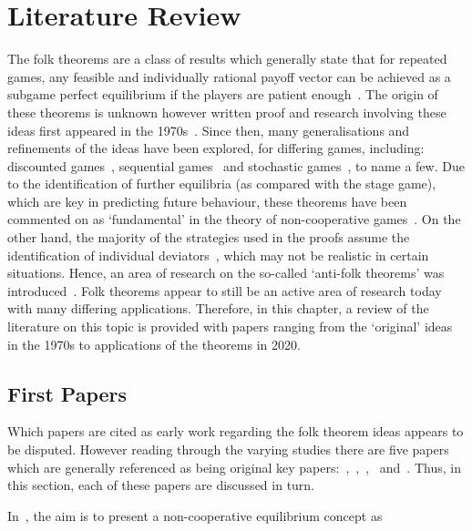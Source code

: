 \chapter{Literature Review}

The folk theorems are a class of results which generally state that for repeated
games, any feasible and individually rational payoff vector can be achieved as a
subgame perfect equilibrium if the players are patient enough~\cite{Li2019}. The
origin of these theorems is unknown however written proof and
research involving these ideas first appeared in the 1970s~\cite{Friedman1971,
Aumann1994, Rubinstein1979}. Since then, many generalisations and refinements of
the ideas have been explored, for differing games, including:
discounted games~\cite{Li2019, Fudenberg1986, Friedman1971}, sequential
games~\cite{} and stochastic games~\cite{}, to
name a few. Due to the identification of further equilibria (as compared with
the stage game), which are key in predicting future behaviour, these theorems
have been commented on as `fundamental' in the theory of non-cooperative
games~\cite{}. On the other hand, the majority of the strategies used in the
proofs assume the identification of individual deviators~\cite{Masso1989}, which may not
be realistic in certain situations. Hence, an area of research on the so-called
`anti-folk theorems' was introduced~\cite{Carmona2006, Masso1989, Peski2012}. Folk theorems appear to still be an
active area of research today~\cite{Ikeda2020, Parras2020, Wang2020} with many differing applications.
Therefore, in this chapter, a review of the literature on this topic is provided
with papers ranging from the `original' ideas in the 1970s to applications of
the theorems in 2020. 


\section{First Papers}
Which papers are cited as early work regarding the folk theorem ideas appears to
be disputed. However reading through the varying studies there are five papers
which are generally referenced as being original key
papers:~\cite{Friedman1971},~\cite{Aumann1994},~\cite{Fudenberg1986},~\cite{Benoit_1985}
and~\cite{Rubinstein1979}. Thus, in this section, each of these papers are
discussed in turn. 

In~\cite{Friedman1971}, the aim is to present a non-cooperative equilibrium
concept as 





